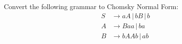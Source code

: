 Convert the following grammar to Chomsky Normal Form:
\begin{align*}
 S &\rightarrow aA \,|\, bB \,|\, b \\
 A &\rightarrow Baa \,|\, ba \\
 B &\rightarrow bAAb \,|\, ab \\
\end{align*}
